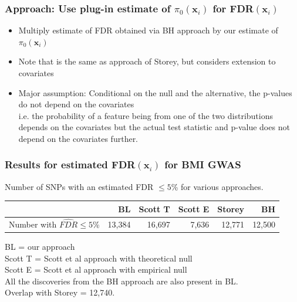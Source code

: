 \documentclass{beamer}
\newcommand{\bx}{\mathbf{x}}
\begin{document}
\begin{frame}
\frametitle{Approach: Use plug-in estimate of $\pi_0(\bx_i)$ for FDR$(\bx_i)$}

\begin{itemize}
\item Multiply estimate of FDR obtained via BH approach by our estimate of $\pi_0(\bx_i)$

\item Note that is the same as approach of Storey, but considers extension to covariates

\item Major assumption: Conditional on the null and the alternative, the p-values do not depend on the covariates\\ \vspace{0.2cm}
i.e. the probability of a feature being from one of the two distributions depends on the covariates but the actual test statistic and p-value
does not depend on the covariates further.
\end{itemize}

\end{frame}


\begin{frame}
\frametitle{Results for estimated FDR$(\bx_i)$ for BMI GWAS}

Number of  SNPs with an estimated FDR $\le5$\% for various approaches.

\begin{table}[ht]
\begin{tabular}{m{2.2cm}rrrrr}
  \hline
 & BL & Scott T & Scott E & Storey & BH \\ 
  \hline
Number with $\widehat{FDR} \le 5$\%  & 13,384 & 16,697 & 7,636 & 12,771 & 12,500 \\ 
   \hline
\end{tabular}
\end{table}

\vspace{0.5cm}
BL = our approach \\
Scott T = Scott et al approach with theoretical null \\
Scott E = Scott et al approach with empirical null \\

\vspace{0.5cm}
All the discoveries from the BH approach are also present in BL.\\
Overlap with Storey = 12,740.

\end{frame}
\end{document}
